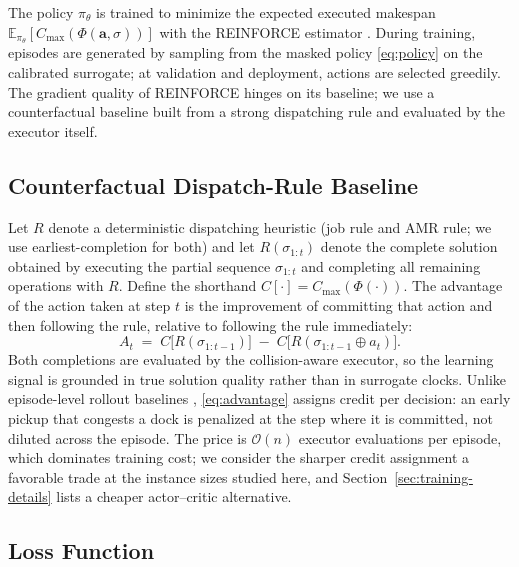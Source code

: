 The policy $\pi_\theta$ is trained to minimize the expected executed
makespan $\mathbb{E}_{\pi_\theta}[C_{\max}(\Phi(\bm{a},\sigma))]$ with
the REINFORCE estimator \cite{williams1992reinforce}. During training,
episodes are generated by sampling from the masked policy
\eqref{eq:policy} on the calibrated surrogate; at validation and
deployment, actions are selected greedily. The gradient quality of
REINFORCE hinges on its baseline; we use a counterfactual baseline
built from a strong dispatching rule and evaluated by the executor
itself.

\subsection{Counterfactual Dispatch-Rule Baseline}
\label{sec:baseline}

Let $R$ denote a deterministic dispatching heuristic (job rule and AMR
rule; we use earliest-completion for both) and let
$R(\sigma_{1:t})$ denote the complete solution obtained by executing
the partial sequence $\sigma_{1:t}$ and completing all remaining
operations with $R$. Define the shorthand
$C[\cdot]=C_{\max}(\Phi(\cdot))$. The advantage of the action taken at
step $t$ is the improvement of committing that action and then
following the rule, relative to following the rule immediately:
\begin{equation}
A_t \;=\; C\big[R(\sigma_{1:t-1})\big]\;-\;
C\big[R(\sigma_{1:t-1}\oplus a_t)\big].
\label{eq:advantage}
\end{equation}
Both completions are evaluated by the collision-aware executor, so the
learning signal is grounded in true solution quality rather than in
surrogate clocks. Unlike episode-level rollout baselines
\cite{rennie2017self,kool2019attention}, \eqref{eq:advantage} assigns
credit per decision: an early pickup that congests a dock is penalized
at the step where it is committed, not diluted across the episode.
The price is $\mathcal{O}(n)$ executor evaluations per episode, which
dominates training cost; we consider the sharper credit assignment a
favorable trade at the instance sizes studied here, and
Section~\ref{sec:training-details} lists a cheaper actor--critic
alternative.

\subsection{Loss Function}

